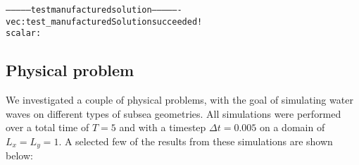 \documentclass[letterpaper,10pt,english]{/usr/share/sphinx/texinputs/sphinxhowto}
\newenvironment{InvisibleVerbatim}
        {\begin{mdframed}[leftmargin=0.1\linewidth,innerleftmargin=3pt,innerrightmargin=3pt, userdefinedwidth=1\linewidth, linewidth=0pt, linecolor=white, usetwoside=false]}
        {\end{mdframed}}
\begin{document}
        

            
                \begin{InvisibleVerbatim}
                \vspace{-0.5\baselineskip}
\begin{alltt}---------------test manufactured solution----------------
vec: test\_manufacturedSolution succeeded!
scalar:\end{alltt}

            \end{InvisibleVerbatim}
            
        
    
\subsection{Physical problem}

We investigated a couple of physical problems, with the goal of
simulating water waves on different types of subsea geometries. All
simulations were performed over a total time of $T=5$ and with a
timestep $\Delta t = 0.005$ on a domain of $L_x = L_y = 1$. A selected
few of the results from these simulations are shown below:

\end{document}
